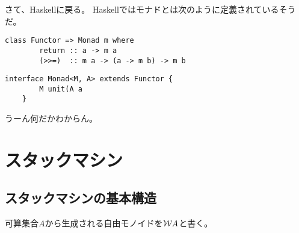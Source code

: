 {	さて、Haskellに戻る。
	Haskellではモナドとは次のように定義されているそうだ。
	\begin{lstlisting}[caption=Monad in Haskell, label=code:Monad in Haskell]
	class Functor => Monad m where
		return :: a -> m a
		(>>=)  :: m a -> (a -> m b) -> m b
	\end{lstlisting}
	\begin{lstlisting}[caption=Monad in Java, label=code:Monad in Java]
	interface Monad<M, A> extends Functor {
		M unit(A a
	}
	\end{lstlisting}
	うーん何だかわからん。
\section{スタックマシン}\label{s1:スタックマシン} %
\begingroup %
	\newcommand{\Drop}{\myop{Drop}}
	\newcommand{\Copy}{\myop{Copy}}
	\newcommand{\Rot}{\myop{Rot}}
	\newcommand{\Prot}{\myop{pRot}}
	\newcommand{\Tuck}{\myop{Tuck}}
	\newcommand{\Plus}{\myop{plus}}
	\newcommand{\Less}{\myop{less}}
	\newcommand{\Apply}{\myop{apply}}

\subsection{スタックマシンの基本構造}\label{s2:スタックマシンの基本構造} %
	可算集合$A$から生成される自由モノイドを${{\mathcal{W}}} A$と書く。

}
